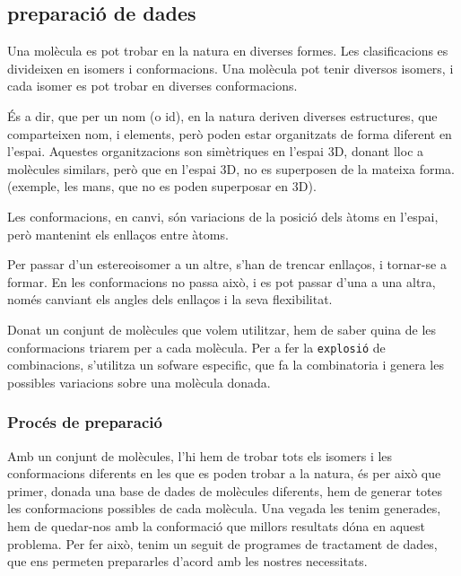 \documentclass[titlepage,a4paper,12pt]{book}
\begin{document}
\subsection{preparació de dades} %
\label{sub:preparacio de dades}
Una molècula es pot trobar en la natura en diverses formes.  Les clasificacions es divideixen en
isomers i conformacions.  Una molècula pot tenir diversos isomers, i cada isomer es pot trobar en  
diverses conformacions.

És a dir, que per un nom (o id), en la natura deriven diverses estructures, que comparteixen nom, i
elements, però poden estar organitzats de forma diferent en l'espai. Aquestes organitzacions son
simètriques en l'espai 3D, donant lloc a molècules similars, però que en l'espai 3D, no es superposen de la
mateixa forma. (exemple, les mans, que no es poden superposar en 3D).

Les conformacions, en canvi, són variacions de la posició dels àtoms en l'espai, però mantenint els
enllaços entre àtoms.

Per passar d'un estereoisomer a un altre, s'han de trencar enllaços, i tornar-se a formar.  En les
conformacions no passa això, i es pot passar d'una a una altra, només canviant els angles dels
enllaços i la seva flexibilitat. 

Donat un conjunt de molècules que volem utilitzar, hem de saber quina de les conformacions triarem
per a cada molècula.  Per a fer la \texttt{explosió} de combinacions, s'utilitza un sofware
especific, que fa la combinatoria i genera les possibles variacions sobre una molècula donada. 

\subsubsection{Procés de preparació} %
\label{ssub:Proces de preparacio}

Amb un conjunt de molècules, l'hi hem de trobar tots els isomers i les conformacions diferents en
les que es poden trobar a la natura, és per això que primer, donada una base de dades de molècules
diferents, hem de generar totes les conformacions possibles de cada molècula.  Una vegada les tenim
generades, hem de quedar-nos amb la conformació que millors resultats dóna en aquest problema.  Per
fer això, tenim un seguit de programes de tractament de dades, que ens permeten prepararles d'acord
amb les nostres necessitats.
\end{document}
